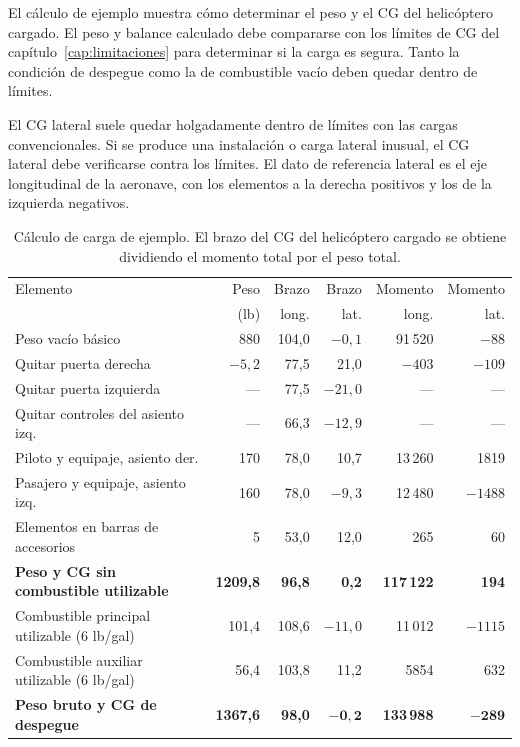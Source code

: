 El cálculo de ejemplo muestra cómo determinar el peso y el CG del helicóptero cargado. El peso y balance calculado debe compararse con los límites de CG del capítulo~\ref{cap:limitaciones} para determinar si la carga es segura. Tanto la condición de despegue como la de combustible vacío deben quedar dentro de límites.

El CG lateral suele quedar holgadamente dentro de límites con las cargas convencionales. Si se produce una instalación o carga lateral inusual, el CG lateral debe verificarse contra los límites. El dato de referencia lateral es el eje longitudinal de la aeronave, con los elementos a la derecha positivos y los de la izquierda negativos.

\begin{table}[htbp]
\centering\footnotesize
\caption{Cálculo de carga de ejemplo. El brazo del CG del helicóptero cargado se obtiene dividiendo el momento total por el peso total.}
\label{tab:ejemplo-pyb}
\setlength{\tabcolsep}{3pt}
\begin{tabularx}{\linewidth}{@{}Yrrrrr@{}}
\toprule
Elemento & Peso & Brazo & Brazo & Momento & Momento \\
 & (lb) & long. & lat. & long. & lat. \\
\midrule
Peso vacío básico & 880 & 104,0 & $-0,1$ & 91\,520 & $-88$ \\
Quitar puerta derecha & $-5,2$ & 77,5 & 21,0 & $-403$ & $-109$ \\
Quitar puerta izquierda & --- & 77,5 & $-21,0$ & --- & --- \\
Quitar controles del asiento izq. & --- & 66,3 & $-12,9$ & --- & --- \\
Piloto y equipaje, asiento der. & 170 & 78,0 & 10,7 & 13\,260 & 1819 \\
Pasajero y equipaje, asiento izq. & 160 & 78,0 & $-9,3$ & 12\,480 & $-1488$ \\
Elementos en barras de accesorios & 5 & 53,0 & 12,0 & 265 & 60 \\
\midrule
\textbf{Peso y CG sin combustible utilizable} & \textbf{1209,8} & \textbf{96,8} & \textbf{0,2} & \textbf{117\,122} & \textbf{194} \\
Combustible principal utilizable (6 lb/gal) & 101,4 & 108,6 & $-11,0$ & 11\,012 & $-1115$ \\
Combustible auxiliar utilizable (6 lb/gal) & 56,4 & 103,8 & 11,2 & 5854 & 632 \\
\midrule
\textbf{Peso bruto y CG de despegue} & \textbf{1367,6} & \textbf{98,0} & $\mathbf{-0,2}$ & \textbf{133\,988} & $\mathbf{-289}$ \\
\bottomrule
\end{tabularx}
\end{table}

